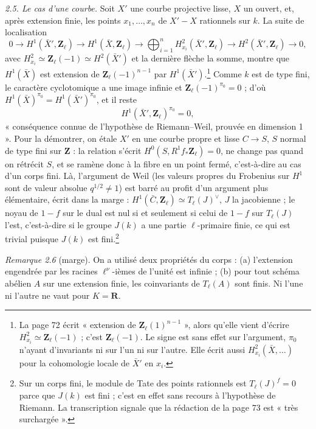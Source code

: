\documentclass[11pt,a4paper]{article}
\begin{document}
\emph{2.5. Le cas d'une courbe.} Soit $X'$ une courbe projective lisse, $X$ un
ouvert, et, après extension finie, les points $x_1, \ldots, x_n$ de
$X' - X$ rationnels sur $k$. La suite de localisation
\[
  0 \to H^1(\bar X', \mathbf{Z}_\ell) \to H^1(\bar X, \mathbf{Z}_\ell) \to
  \bigoplus_{i=1}^n H^2_{x_i}(\bar X', \mathbf{Z}_\ell) \to
  H^2(\bar X', \mathbf{Z}_\ell) \to 0 ,
\]
avec $H^2_{x_i} \simeq \mathbf{Z}_\ell(-1) \simeq H^2(\bar X')$ et la dernière
flèche la somme, montre que $H^1(\bar X)$ est extension de
$\mathbf{Z}_\ell(-1)^{n-1}$ par $H^1(\bar X')$.\footnote{La page 72 écrit
« extension de $\mathbf{Z}_\ell(1)^{n-1}$ », alors qu'elle vient d'écrire
$H^2_{x_i} \simeq \mathbf{Z}_\ell(-1)$ ; c'est $\mathbf{Z}_\ell(-1)$. Le signe
est sans effet sur l'argument, $\pi_0$ n'ayant d'invariants ni sur l'un ni sur
l'autre. Elle écrit aussi $H^2_{x_i}(\bar X, \ldots)$ pour la cohomologie locale
de $\bar X'$ en $x_i$.} Comme $k$ est de type fini, le caractère cyclotomique a
une image infinie et $\mathbf{Z}_\ell(-1)^{\pi_0} = 0$ ; d'où
$H^1(\bar X)^{\pi_0} = H^1(\bar X')^{\pi_0}$, et il reste
\[
  H^1(\bar X', \mathbf{Z}_\ell)^{\pi_0} = 0 , \tag{2.5.5}
\]
« conséquence connue de l'hypothèse de Riemann--Weil, prouvée en dimension 1 ».
Pour la démontrer, on étale $X'$ en une courbe propre et lisse $C \to S$, $S$
normal de type fini sur $\mathbf{Z}$ : la relation s'écrit
$H^0(S, R^1 f_*\mathbf{Z}_\ell) = 0$, ne change pas quand on rétrécit $S$, et se
ramène donc à la fibre en un point fermé, c'est-à-dire au cas d'un corps fini.
Là, l'argument de Weil (les valeurs propres du Frobenius sur $H^1$ sont de
valeur absolue $q^{1/2} \neq 1$) est barré au profit d'un argument plus
élémentaire, écrit dans la marge : $H^1(\bar C, \mathbf{Z}_\ell) \simeq
T_\ell(J)^\vee$, $J$ la jacobienne ; le noyau de $1 - f$ sur le dual est nul si
et seulement si celui de $1 - f$ sur $T_\ell(J)$ l'est, c'est-à-dire si le groupe
$J(k)$ a une partie $\ell$-primaire finie, ce qui est trivial puisque $J(k)$ est
fini.\footnote{Sur un corps fini, le module de Tate des points rationnels est
$T_\ell(J)^{f} = 0$ parce que $J(k)$ est fini ; c'est en effet sans recours à
l'hypothèse de Riemann. La transcription signale que la rédaction de la page 73
est « très surchargée ».}

\emph{Remarque 2.6} (marge). On a utilisé deux propriétés du corps : (a)
l'extension engendrée par les racines $\ell^\nu$-ièmes de l'unité est infinie ;
(b) pour tout schéma abélien $A$ sur une extension finie, les coinvariants de
$T_\ell(A)$ sont finis. Ni l'une ni l'autre ne vaut pour $K = \mathbf{R}$.
\end{document}
